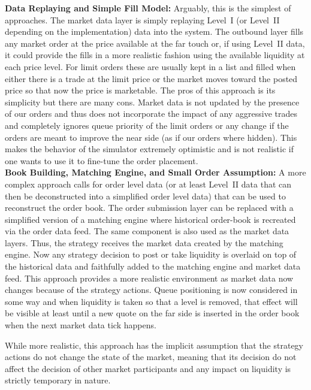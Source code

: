 \noindent\textbf{Data Replaying and Simple Fill Model:} Arguably, this is the simplest of approaches. The market data layer is simply replaying Level~I (or Level~II depending on the implementation) data into the system. The outbound layer fills any market order at the price available at the far touch or, if using Level~II data, it could provide the fills in a more realistic fashion using the available liquidity at each price level. For limit orders these are usually kept in a list and filled when either there is a trade at the limit price or the market moves toward the posted price so that now the price is marketable. The pros of this approach is its simplicity but there are many cons. Market data is not updated by the presence of our orders and thus does not incorporate the impact of any aggressive trades and completely ignores queue priority of the limit orders or any change if the orders are meant to improve the near side (as if our orders where hidden). This makes the behavior of the simulator extremely optimistic and is not realistic if one wants to use it to fine-tune the order placement. \\


\noindent\textbf{Book Building, Matching Engine, and Small Order Assumption:} A more complex approach calls for order level data (or at least Level~II data that can then be deconstructed into a simplified order level data) that can be used to reconstruct the order book. The order submission layer can be replaced with a simplified version of a matching engine where historical order-book is recreated via the order data feed. The same component is also used as the market data layers. Thus, the strategy receives the market data created by the matching engine. Now any strategy decision to post or take liquidity is overlaid on top of the historical data and faithfully added to the matching engine and market data feed. This approach provides a more realistic environment as market data now changes because of the strategy actions. Queue positioning is now considered in some way and when liquidity is taken so that a level is removed, that effect will be visible at least until a new quote on the far side is inserted in the order book when the next market data tick happens.


While more realistic, this approach has the implicit assumption that the strategy actions do not change the state of the market, meaning that its decision do not affect the decision of other market participants and any impact on liquidity is strictly temporary in nature. \\


